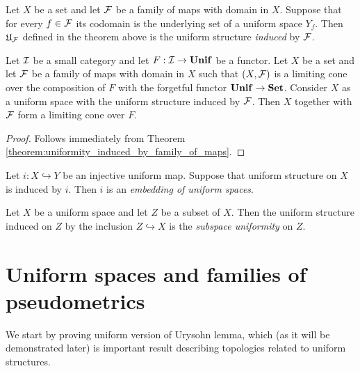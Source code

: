 \documentclass[10pt]{amsart}
\begin{document}
\begin{definition}
	Let $X$ be a set and let ${\mathcal F}$ be a family of maps with domain in $X$. Suppose that for every $f \in {\mathcal F}$ its codomain is the underlying set of a uniform space $Y_f$. Then ${\mathfrak U}_{{\mathcal F}}$ defined in the theorem above is the uniform structure \textit{induced} by ${\mathcal F}$.
\end{definition}

\begin{corollary}\label{corollary:limits_in_category_of_uniform_spaces}
	Let ${\mathcal I}$ be a small category and let $F:{\mathcal I} \rightarrow \mathbf{Unif}$ be a functor. Let $X$ be a set and let ${\mathcal F}$ be a family of maps with domain in $X$ such that $(X,{\mathcal F})$ is a limiting cone over the composition of $F$ with the forgetful functor $\mathbf{Unif} \rightarrow \mathbf{Set}$. Consider $X$ as a uniform space with the uniform structure induced by ${\mathcal F}$. Then $X$ together with ${\mathcal F}$ form a limiting cone over $F$.
\end{corollary}
\begin{proof}
	Follows immediately from Theorem \ref{theorem:uniformity_induced_by_family_of_maps}.
\end{proof}

\begin{definition}
	Let $i:X \hookrightarrow Y$ be an injective uniform map. Suppose that uniform structure on $X$ is induced by $i$. Then $i$ is an \textit{embedding of uniform spaces}.
\end{definition}

\begin{definition}
	Let $X$ be a uniform space and let $Z$ be a subset of $X$. Then the uniform structure induced on $Z$ by the inclusion $Z\hookrightarrow X$ is the \textit{subspace uniformity} on $Z$.
\end{definition}

\section{Uniform spaces and families of pseudometrics}
\noindent
We start by proving uniform version of Urysohn lemma, which (as it will be demonstrated later) is important result describing topologies related to uniform structures.
\end{document}
